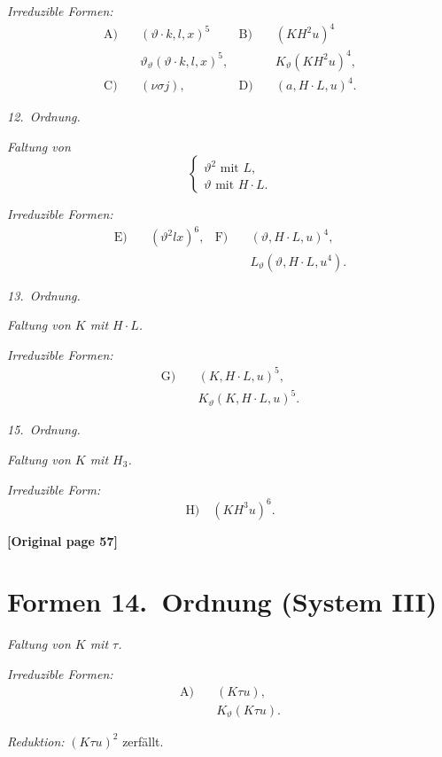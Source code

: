 \documentclass[12pt,a4paper]{article}
\begin{document}
\textit{Irreduzible Formen:}
\begin{align*}
\text{A)} \quad &(\vartheta \cdot k, l, x)^5 & \text{B)} \quad &(KH^2 u)^4\\
& \vartheta_\vartheta (\vartheta \cdot k, l, x)^5, & & K_\vartheta (KH^2 u)^4,\\
\text{C)} \quad &(\nu \sigma j), & \text{D)} \quad &(a, H \cdot L, u)^4.
\end{align*}

\textit{12.\ Ordnung.}

\textit{Faltung von}
\[\begin{cases}
\vartheta^2 \text{ mit } L,\\
\vartheta \text{ mit } H \cdot L.
\end{cases}\]

\textit{Irreduzible Formen:}
\begin{align*}
\text{E)} \quad &(\vartheta^2 lx)^6, & \text{F)} \quad &(\vartheta, H \cdot L, u)^4,\\
& & & L_\vartheta (\vartheta, H \cdot L, u^4).
\end{align*}

\textit{13.\ Ordnung.}

\textit{Faltung von $K$ mit $H \cdot L$.}

\textit{Irreduzible Formen:}
\begin{align*}
\text{G)} \quad &(K, H \cdot L, u)^5,\\
& K_\vartheta (K, H \cdot L, u)^5.
\end{align*}

\textit{15.\ Ordnung.}

\textit{Faltung von $K$ mit $H_3$.}

\textit{Irreduzible Form:}
\[\text{H)} \quad (KH^3 u)^6.\]

\noindent\textbf{[Original page 57]}

\section{Formen 14.\ Ordnung (System III)}

\textit{Faltung von $K$ mit $\tau$.}

\textit{Irreduzible Formen:}
\begin{align*}
\text{A)} \quad &(K\tau u),\\
& K_\vartheta (K\tau u).
\end{align*}

\textit{Reduktion:} $(K\tau u)^2$ zerfällt.
\end{document}
